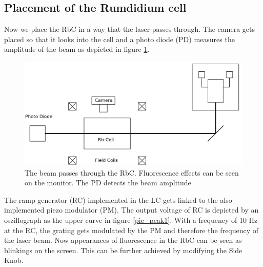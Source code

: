 \subsection{Placement of the Rumdidium cell}
Now we place the RbC in a way that the laser passes through. The camera gets placed so that it looks into the cell and a photo diode (PD) measures the 
amplitude of the beam as depicted in figure \ref{pic_setup2}.
\begin{figure}[t]
 \includegraphics[width=\textwidth]{../pics/setup2.png}
 \caption{The beam passes through the RbC. Fluorescence effects can be seen on the monitor. The PD detects the beam amplitude}
 \label{pic_setup2}
\end{figure}
The ramp generator (RC) implemented in the LC gets linked to the also implemented piezo modulator (PM). The output voltage of RC is depicted by an 
oszillograph as the upper curve in figure \ref{pic_peak1}. With a frequency of 10 Hz at the RC, the grating gets modulated by the PM and therefore the 
frequency of the laser beam.
Now appearances of fluorescence in the RbC can be seen as blinkings on the screen. This can be further achieved by modifying the Side Knob.

